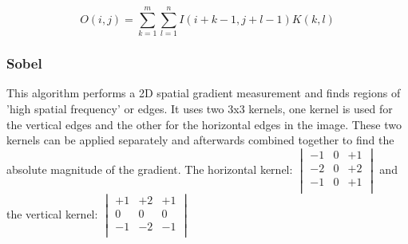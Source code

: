 \documentclass[12pt]{article}
\begin{document}
\begin{equation}
O(i, j) =  \sum\limits_{k=1}^m\sum\limits_{l=1}^n I(i + k - 1, j + l - 1)K(k,l)
\end{equation}

\subsubsection{Sobel}
 This algorithm performs a 2D spatial gradient measurement and finds regions of 'high spatial frequency' or edges. It uses two 3x3 kernels, one kernel is used for the vertical edges and the other for the horizontal edges in the image. These two kernels can be applied separately and afterwards combined together to find the absolute magnitude of the gradient.
 \newline
 \newline
 The horizontal kernel: 
 $\begin{vmatrix}
	-1 & 0 & +1\\
	-2 & 0 & +2\\
	-1 & 0 & +1\\
\end{vmatrix}$
and the vertical kernel:
$\begin{vmatrix}
	+1 & +2 & +1\\
	0 & 0 & 0\\
	-1 & -2 & -1\\
\end{vmatrix}$
\end{document}
